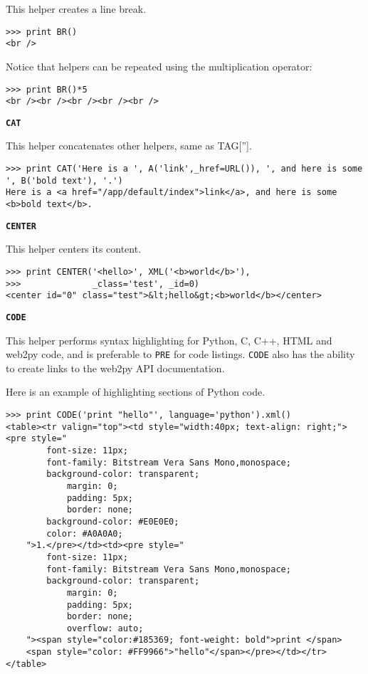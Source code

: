 \documentclass[justified,sixbynine,notoc]{tufte-book}
\def\ft{\small\tt}
\def\inxx#1{\index{#1}}
\begin{document}
\begin{fullwidth}
\inxx{BR}

This helper creates a line break.
\begin{lstlisting}
>>> print BR()
<br />
\end{lstlisting}

Notice that helpers can be repeated using the multiplication operator:

\begin{lstlisting}
>>> print BR()*5
<br /><br /><br /><br /><br />
\end{lstlisting}

{\bf {\ft CAT}}

\inxx{CAT}

This helper concatenates other helpers, same as TAG[''].
\begin{lstlisting}
>>> print CAT('Here is a ', A('link',_href=URL()), ', and here is some ', B('bold text'), '.')
Here is a <a href="/app/default/index">link</a>, and here is some <b>bold text</b>.
\end{lstlisting}

{\bf {\ft CENTER}}

\inxx{CENTER}

This helper centers its content.
\begin{lstlisting}
>>> print CENTER('<hello>', XML('<b>world</b>'),
>>>              _class='test', _id=0)
<center id="0" class="test">&lt;hello&gt;<b>world</b></center>
\end{lstlisting}

{\bf {\ft CODE}}

\inxx{CODE}

This helper performs syntax highlighting for Python, C, C++, HTML and web2py code, and is preferable to {\ft PRE} for code listings. {\ft CODE} also has the ability to create links to the web2py API documentation.

Here is an example of highlighting sections of Python code.
\begin{lstlisting}
>>> print CODE('print "hello"', language='python').xml()
<table><tr valign="top"><td style="width:40px; text-align: right;"><pre style="
        font-size: 11px;
        font-family: Bitstream Vera Sans Mono,monospace;
        background-color: transparent;
            margin: 0;
            padding: 5px;
            border: none;
        background-color: #E0E0E0;
        color: #A0A0A0;
    ">1.</pre></td><td><pre style="
        font-size: 11px;
        font-family: Bitstream Vera Sans Mono,monospace;
        background-color: transparent;
            margin: 0;
            padding: 5px;
            border: none;
            overflow: auto;
    "><span style="color:#185369; font-weight: bold">print </span>
    <span style="color: #FF9966">"hello"</span></pre></td></tr>
</table>
\end{lstlisting}


\end{fullwidth}
\end{document}
